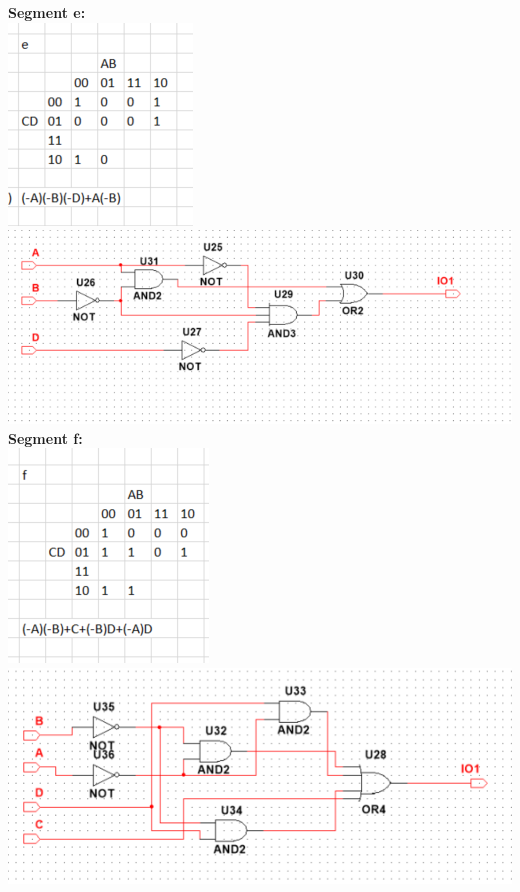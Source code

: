 \documentclass[12pt,a4paper]{article}
\begin{document}
\textbf{Segment e:}\\
\includegraphics[scale=0.8]{7seg/seg4}\\
\includegraphics[scale=1]{7seg/seg4circ}\\
\textbf{Segment f:}\\
\includegraphics[scale=0.8]{7seg/seg5}\\
\includegraphics[scale=1]{7seg/seg5circ}\\
\end{document}
